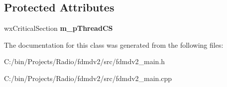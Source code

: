\subsection*{Protected Attributes}
\begin{DoxyCompactItemize}
\item 
\hypertarget{class_main_frame_a52c9829b1a1304bfb6ce8f6c3cb7cb98}{wx\-Critical\-Section {\bfseries m\-\_\-p\-Thread\-C\-S}}\label{class_main_frame_a52c9829b1a1304bfb6ce8f6c3cb7cb98}

\end{DoxyCompactItemize}


The documentation for this class was generated from the following files\-:\begin{DoxyCompactItemize}
\item 
C\-:/bin/\-Projects/\-Radio/fdmdv2/src/fdmdv2\-\_\-main.\-h\item 
C\-:/bin/\-Projects/\-Radio/fdmdv2/src/fdmdv2\-\_\-main.\-cpp\end{DoxyCompactItemize}
